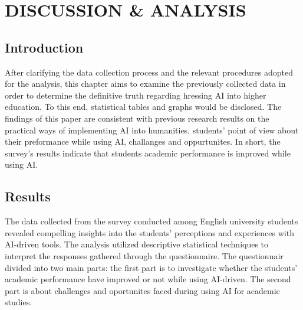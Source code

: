 \chapter{DISCUSSION \& ANALYSIS}
\section{Introduction}
After clarifying the data collection process and the relevant procedures adopted for
the analysis, this chapter aims to examine the previously collected data in order to determine
the definitive truth regarding hressing AI into higher education. To this end, statistical
tables and graphs would be disclosed. The findings of this
paper are consistent with previous research results on the practical ways of implementing AI into
humanities, students' point of view about their preformance while using AI, challanges and oppurtunites.
In short, the survey’s results indicate that students academic performance is improved while using AI.
\section{Results}
The data collected from the survey conducted among English university students 
revealed compelling insights into the students' perceptions and experiences with AI-driven tools. 
The analysis utilized descriptive statistical techniques to interpret the responses gathered through the questionnaire.
The questionnair divided into two main parts: the first part is to investigate
whether the students' academic performance have improved or not while using AI-driven. The second
part is about challenges and oportunites faced during using AI for academic studies.


